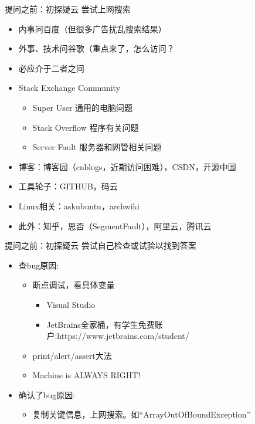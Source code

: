 \documentclass[10pt]{beamer}
\begin{document}
\begin{frame}[fragile]{提问之前：初探疑云}
    尝试上网搜索
    \begin{itemize}
        \item 内事问百度（但很多广告扰乱搜索结果）
        \item 外事、技术问谷歌（重点来了，怎么访问？
        \item 必应介于二者之间
        \item Stack Exchange Community
              \begin{itemize}
                  \item Super User 通用的电脑问题
                  \item Stack Overflow 程序有关问题
                  \item Server Fault 服务器和网管相关问题
              \end{itemize}
        \item 博客：博客园（cnblogs，近期访问困难），CSDN，开源中国
        \item 工具轮子：GITHUB，码云
        \item Linux相关：askubuntu，archwiki
        \item 此外：知乎，思否（SegmentFault），阿里云，腾讯云
    \end{itemize}
\end{frame}

\begin{frame}[fragile]{提问之前：初探疑云}
    尝试自己检查或试验以找到答案
    \begin{itemize}
        \item 查bug原因:
              \begin{itemize}
                  \item 断点调试，看具体变量
                        \begin{itemize}
                            \item Visual Studio
                            \item JetBrains全家桶，有学生免费账户:https://www.jetbrains.com/student/
                        \end{itemize}
                  \item print/alert/assert大法
                  \item Machine is ALWAYS RIGHT!
              \end{itemize}
        \item 确认了bug原因:
              \begin{itemize}
                  \item 复制关键信息，上网搜索。如“ArrayOutOfBoundException”
              \end{itemize}
    \end{itemize}
\end{frame}
\end{document}
